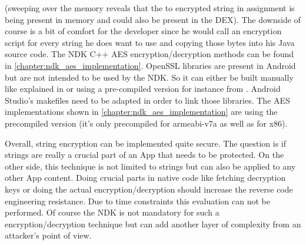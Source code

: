 (sweeping over the memory reveals that the to encrypted string in assignment
 is being present
in memory and could also be present in the DEX).
The downside of course is a bit of comfort for the developer since he would
call an encryption script for every string he does want to use and copying
those bytes into his Java source code.
The NDK C++ AES encryption/decryption methods can be found in \autoref{chapter:ndk_aes_implementation}. OpenSSL libraries are present in Android but are
not intended to be used by the NDK. So it can either be built manually
like explained in \parencite{openssl_building} or using a pre-compiled version
for instance from \parencite{openssl_precompiled}. Android Studio's makefiles
need to be adapted in order to link those libraries.
The AES implementations shown in \autoref{chapter:ndk_aes_implementation} are
using the precompiled version (it's only precompiled for armeabi-v7a as
well as for x86).

Overall, string encryption can be implemented quite secure. The question is
if strings are really a crucial part of an App that needs to be protected.
On the other side, this technique is not limited to strings but can also
be applied to any other App content. Doing crucial parts in native code
like fetching decryption keys or doing the actual encryption/decryption
should increase the reverse code engineering resistance. Due to time
constraints this evaluation can not be performed. Of course the NDK is not
mandatory for such a encryption/decryption technique but can add another
layer of complexity from an attacker's point of view.
